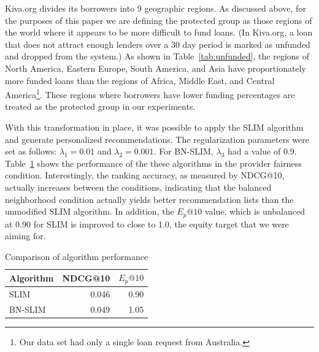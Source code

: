 Kiva.org divides its borrowers into 9 geographic regions. As discussed above, for the purposes of this paper we are defining the protected group as those regions of the world where it appears to be more difficult to fund loans. (In Kiva.org, a loan that does not attract enough lenders over a 30 day period is marked as unfunded and dropped from the system.) As shown in Table~\ref{tab:unfunded}, the regions of North America, Eastern Europe, South America, and Asia have proportionately more funded loans than the regions of Africa, Middle East, and Central America\footnote{Our data set had only a single loan request from Australia.}. These regions where borrowers have lower funding percentages are treated as the protected group in our experiments.

With this transformation in place, it was possible to apply the SLIM algorithm and generate personalized recommendations. The regularization parameters were set as follows: $\lambda_1 = 0.01$ and $\lambda_2 = 0.001$. For BN-SLIM, $\lambda_3$ had a value of 0.9. Table~\ref{tab:results} shows the performance of the these algorithms in the provider fairness condition. Interestingly, the ranking accuracy, as measured by NDCG@10, actually increases between the conditions, indicating that the balanced neighborhood condition actually yields better recommendation lists than the unmodified SLIM algorithm. In addition, the $E_p@10$ value, which is unbalanced at 0.90 for SLIM is improved to close to 1.0, the equity target that we were aiming for.

\begin{table}
    \centering
\begin{tabular}{l|r|r}
    Algorithm & NDCG@10 & $E_p@10$ \\ \hline
    SLIM & 0.046 & 0.90 \\ \hline
    BN-SLIM & 0.049 & 1.05 \\ \hline
\end{tabular}
    \caption{Comparison of algorithm performance}
    \label{tab:results}
\end{table}



